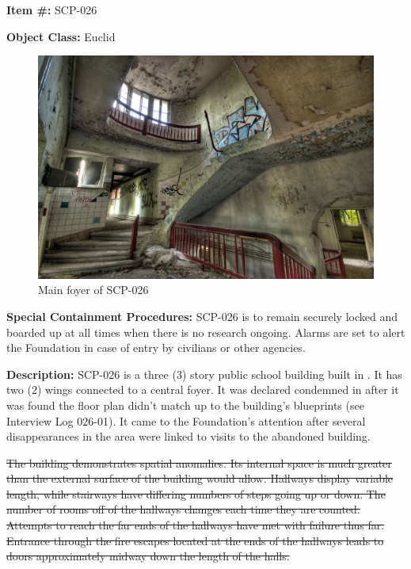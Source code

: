 
\textbf{Item \#:} SCP-026

\textbf{Object Class:} Euclid

\begin{figure}[h]
\begin{center}
\includegraphics[scale=0.2]{scp/026a.jpg}
\linebreak Main foyer of SCP-026
\end{center}
\end{figure}

\textbf{Special Containment Procedures:} SCP-026 is to remain securely locked and boarded up at all times when there is no research ongoing. Alarms are set to alert the Foundation in case of entry by civilians or other agencies.

\textbf{Description:} SCP-026 is a three (3) story public school building built in . It has two (2) wings connected to a central foyer. It was declared condemned in  after it was found the floor plan didn't match up to the building's blueprints (see Interview Log 026-01). It came to the Foundation's attention after several disappearances in the area were linked to visits to the abandoned building.

\sout{The building demonstrates spatial anomalies. Its internal space is much greater than the external surface of the building would allow. Hallways display variable length, while stairways have differing numbers of steps going up or down. The number of rooms off of the hallways changes each time they are counted. Attempts to reach the far ends of the hallways have met with failure thus far. Entrance through the fire escapes located at the ends of the hallways leads to doors approximately midway down the length of the halls.}

